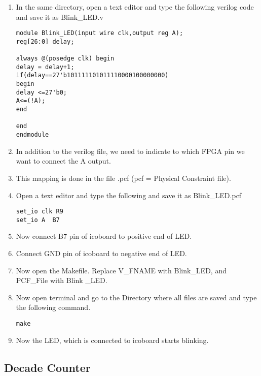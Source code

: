 \documentclass[journal,12pt,twocolumn]{IEEEtran}
\begin{document}
\begin{enumerate}
    \item In the same directory, open a text editor and type the following verilog code and save it as Blink\_LED.v
    
    \begin{lstlisting}
module Blink_LED(input wire clk,output reg A);
reg[26:0] delay;

always @(posedge clk) begin
delay = delay+1; 
if(delay==27'b101111101011110000100000000)
begin 
delay <=27'b0;
A<=(!A);
end

end   
endmodule
\end{lstlisting}

    \item In addition to the verilog file, we need to indicate to which FPGA pin we want to connect the A output.
    \item This mapping is done in the file .pcf (pcf = Physical Constraint file).
    \item Open a text editor and type the following and save it as Blink\_LED.pcf
    \begin{lstlisting}
set_io clk R9
set_io A  B7
\end{lstlisting}
   \item Now connect B7 pin of icoboard to positive end of LED.
   \item Connect GND pin of icoboard to negative end of LED.
    
\item Now open the Makefile. Replace V\_FNAME with Blink\_LED, and PCF\_File with Blink    \_LED.  
    
    
    \item Now open terminal and go to the Directory where all files are saved and type the following command.
    \begin{verbatim}
make 
    \end{verbatim}
    \item Now the LED, which is connected to icoboard starts blinking.
\end{enumerate}
\subsection{Decade Counter}
\end{document}
